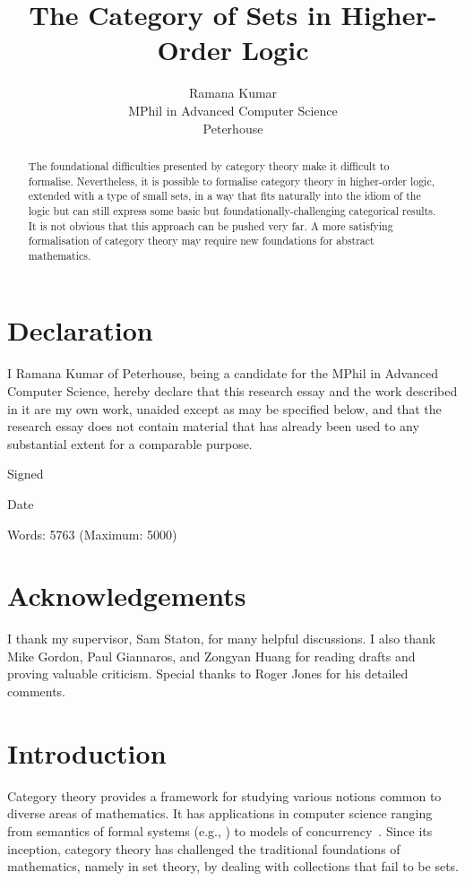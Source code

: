 \documentclass[twoside,titlepage,11pt]{article}
\title{The Category of Sets in Higher-Order Logic}
\author{Ramana Kumar\\MPhil in Advanced Computer Science\\Peterhouse}
\begin{document}
\maketitle
\section*{Declaration}%
\thispagestyle{empty}
I Ramana Kumar of Peterhouse, being a candidate for the MPhil in Advanced Computer Science, hereby declare that this research essay and the work described in it are my own work, unaided except as may be specified below, and that the research essay does not contain material that has already been used to any substantial extent for a comparable purpose.

\vspace{1em}
\noindent Signed

\vspace{1em}
\noindent Date

\vspace{2em}
\noindent Words: 5763 (Maximum: 5000)
\vspace{5em}
\section*{Acknowledgements}%
I thank my supervisor, Sam Staton, for many helpful discussions.
I also thank Mike Gordon, Paul Giannaros, and Zongyan Huang for reading drafts and proving valuable criticism.
Special thanks to Roger Jones for his detailed comments.
\begin{abstract}%
The foundational difficulties presented by category theory make it difficult to formalise.
Nevertheless, it is possible to formalise category theory in higher-order logic, extended with a type of small sets, in a way that fits naturally into the idiom of the logic but can still express some basic but foundationally-challenging categorical results.
It is not obvious that this approach can be pushed very far.
A more satisfying formalisation of category theory may require new foundations for abstract mathematics.
\end{abstract}%
\section{Introduction}%
Category theory provides a framework for studying various notions common to diverse areas of mathematics.
It has applications in computer science ranging from semantics of formal systems (e.g., \cite{CroleCT,JacobsCLTT}) to models of concurrency~\cite{DBLP:conf/csl/CattaniW96}.
Since its inception, category theory has challenged the traditional foundations of mathematics, namely in set theory, by dealing with collections that fail to be sets.
\end{document}
